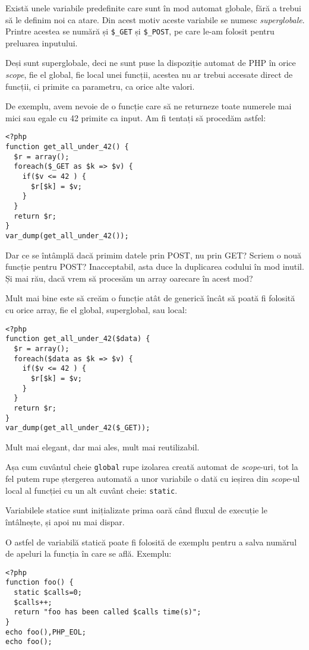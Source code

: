 
Există unele variabile predefinite care sunt în mod automat
globale, fără a trebui să le definim noi ca atare. Din acest
motiv aceste variabile se numesc \textsl{superglobale}.
Printre acestea se numără și \texttt{\$\_GET} și
\texttt{\$\_POST}, pe care le-am folosit pentru
preluarea inputului.

Deși sunt superglobale, deci ne sunt puse la dispoziție
automat de PHP în orice \textit{scope}, fie el global,
fie local unei funcții, acestea nu ar trebui accesate direct
de funcții, ci primite ca parametru, ca orice alte valori.

De exemplu, avem nevoie de o funcție care să ne returneze
toate numerele mai mici sau egale cu 42 primite ca input.
Am fi tentați să procedăm astfel:
\begin{lstlisting}
<?php
function get_all_under_42() {
  $r = array();
  foreach($_GET as $k => $v) {
	if($v <= 42 ) {
	  $r[$k] = $v;
	}
  }
  return $r;
}
var_dump(get_all_under_42());
\end{lstlisting}
Dar ce se întâmplă dacă primim datele prin POST, nu prin GET?
Scriem o nouă funcție pentru POST? Inacceptabil, asta duce
la duplicarea codului în mod inutil. Și mai rău, dacă
vrem să procesăm un array oarecare în acest mod?

Mult mai bine este să creăm o funcție atât de generică încât
să poată fi folosită cu orice array, fie el global,
superglobal, sau local:
\begin{lstlisting}
<?php
function get_all_under_42($data) {
  $r = array();
  foreach($data as $k => $v) {
	if($v <= 42 ) {
	  $r[$k] = $v;
	}
  }
  return $r;
}
var_dump(get_all_under_42($_GET));
\end{lstlisting}
Mult mai elegant, dar mai ales, mult mai
reutilizabil.

Așa cum cuvântul cheie \texttt{global} rupe izolarea creată
automat de \textit{scope}-uri, tot la fel putem rupe ștergerea
automată a unor variabile o dată cu ieșirea din \textit{scope}-ul local
al funcției cu un alt cuvânt cheie: \texttt{static}.

Variabilele statice sunt inițializate prima oară când fluxul
de execuție le întâlnește, și apoi nu mai dispar.

O astfel de variabilă statică poate fi folosită de exemplu
pentru a salva numărul de apeluri la funcția în care se află. Exemplu:
\begin{lstlisting}
<?php
function foo() {
  static $calls=0;
  $calls++;
  return "foo has been called $calls time(s)";
}
echo foo(),PHP_EOL;
echo foo();
\end{lstlisting}

